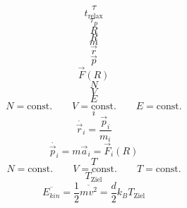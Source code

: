 \documentclass{scrreprt}
\begin{document}
\begin{equation}
\tau
\end{equation}
\begin{equation}
t_\text{relax}
\end{equation}
\begin{equation}
\tau_p
\end{equation}
\begin{equation}
R
\end{equation}
\begin{equation}
R
\end{equation}
\begin{equation}
m
\end{equation}
\begin{equation}
\vec r
\end{equation}
\begin{equation}
\vec p
\end{equation}
\begin{equation}
\vec{F}(R)
\end{equation}
\begin{equation}
N
\end{equation}
\begin{equation}
V
\end{equation}
\begin{equation}
E
\end{equation}
\begin{equation}
  N = \text{const.}
  \qquad
  V = \text{const.}
  \qquad
  E = \text{const.}
\end{equation}
\begin{equation}
i
\end{equation}
\begin{equation}
  \dot{\vec r_i} = \frac{\vec p_i}{m_i}
\end{equation}
\begin{equation}
  \dot{\vec p_i} = m \vec a_i = \vec F_i(R)
\end{equation}
\begin{equation}
T
\end{equation}
\begin{equation}
  N = \text{const.}
  \qquad
  V = \text{const.}
  \qquad
  T = \text{const.}
\end{equation}
\begin{equation}
T_\text{Ziel}
\end{equation}
\begin{equation}
  \overline{E_{kin}} = \frac{1}{2} \overline{m v^2} = \frac{d}{2} k_B T_\text{Ziel}
  \label{eq:ekanonisch}
\end{equation}
\end{document}

